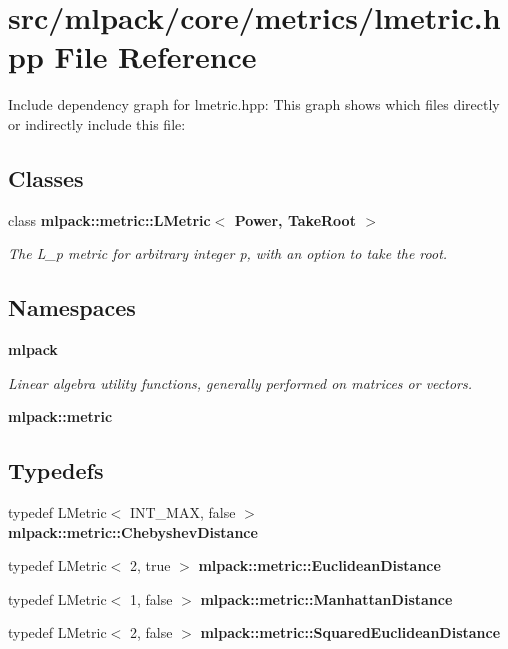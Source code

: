 \section{src/mlpack/core/metrics/lmetric.hpp File Reference}
\label{lmetric_8hpp}
Include dependency graph for lmetric.\-hpp\-:
This graph shows which files directly or indirectly include this file\-:
\subsection*{Classes}
\begin{DoxyCompactItemize}
\item 
class {\bf mlpack\-::metric\-::\-L\-Metric$<$ Power, Take\-Root $>$}
\begin{DoxyCompactList}\small\item\em The L\-\_\-p metric for arbitrary integer p, with an option to take the root. \end{DoxyCompactList}\end{DoxyCompactItemize}
\subsection*{Namespaces}
\begin{DoxyCompactItemize}
\item 
{\bf mlpack}
\begin{DoxyCompactList}\small\item\em Linear algebra utility functions, generally performed on matrices or vectors. \end{DoxyCompactList}\item 
{\bf mlpack\-::metric}
\end{DoxyCompactItemize}
\subsection*{Typedefs}
\begin{DoxyCompactItemize}
\item 
typedef L\-Metric$<$ I\-N\-T\-\_\-\-M\-A\-X, false $>$ {\bf mlpack\-::metric\-::\-Chebyshev\-Distance}
\item 
typedef L\-Metric$<$ 2, true $>$ {\bf mlpack\-::metric\-::\-Euclidean\-Distance}
\item 
typedef L\-Metric$<$ 1, false $>$ {\bf mlpack\-::metric\-::\-Manhattan\-Distance}
\item 
typedef L\-Metric$<$ 2, false $>$ {\bf mlpack\-::metric\-::\-Squared\-Euclidean\-Distance}
\end{DoxyCompactItemize}


